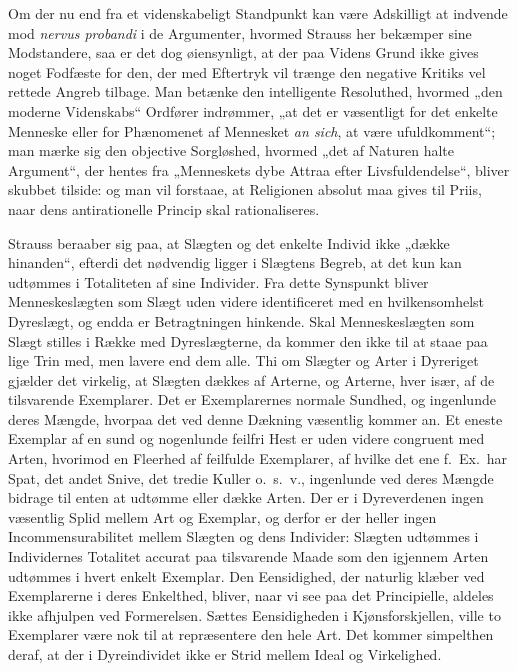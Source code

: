 \documentclass[12pt]{book}
\begin{document}
Om der nu end fra et videnskabeligt Standpunkt kan være Adskilligt
at indvende mod \textit{nervus probandi} i de Argumenter, hvormed
Strauss her bekæmper sine Modstandere, saa er det dog øiensynligt,
at der paa Videns Grund ikke gives noget Fodfæste for den, der med
Eftertryk vil trænge den negative Kritiks vel rettede Angreb
tilbage. Man betænke den intelligente Resoluthed, hvormed „den
moderne Videnskabs“ Ordfører indrømmer, „at det er væsentligt for
det enkelte Menneske eller for Phænomenet af Mennesket \textit{an
sich}, at være ufuldkomment“; man mærke sig den objective
Sorgløshed, hvormed „det af Naturen halte Argument“, der hentes fra
„Menneskets dybe Attraa efter Livsfuldendelse“, bliver skubbet
tilside: og man vil forstaae, at Religionen absolut maa gives til
Priis, naar dens antirationelle Princip skal rationaliseres.

Strauss beraaber sig paa, at Slægten og det enkelte Individ ikke
„dække hinanden“, efterdi det nødvendig ligger i Slægtens Begreb, at
det kun kan udtømmes i Totaliteten af sine Individer. Fra dette
Synspunkt bliver Menneskeslægten som Slægt uden videre identificeret
med en hvilkensomhelst Dyreslægt, og endda er Betragtningen
hinkende. Skal Menneskeslægten som Slægt stilles i
Række med Dyreslægterne, da kommer den ikke til at staae paa lige
Trin med, men lavere end dem alle. Thi om Slægter og Arter i
Dyreriget gjælder det virkelig, at Slægten dækkes af Arterne, og
Arterne, hver især, af de tilsvarende Exemplarer. Det er
Exemplarernes normale Sundhed, og ingenlunde deres Mængde, hvorpaa
det ved denne Dækning væsentlig kommer an. Et eneste Exemplar af en
sund og nogenlunde feilfri Hest er uden videre congruent med Arten,
hvorimod en Fleerhed af feilfulde Exemplarer, af hvilke det ene
f.\ Ex.\ har Spat, det andet Snive, det tredie Kuller o.\ s.\ v.,
ingenlunde ved deres Mængde bidrage til enten at udtømme eller dække
Arten. Der er i Dyreverdenen ingen væsentlig Splid mellem Art og
Exemplar, og derfor er der heller ingen Incommensurabilitet mellem
Slægten og dens Individer: Slægten udtømmes i Individernes Totalitet
accurat paa tilsvarende Maade som den igjennem Arten udtømmes i
hvert enkelt Exemplar. Den Eensidighed, der naturlig klæber ved
Exemplarerne i deres Enkelthed, bliver, naar vi see paa det
Principielle, aldeles ikke afhjulpen ved Formerelsen. Sættes
Eensidigheden i Kjønsforskjellen, ville to Exemplarer være nok til
at repræsentere den hele Art. Det kommer simpelthen deraf, at der i
Dyreindividet ikke er Strid mellem Ideal og Virkelighed.
\end{document}
